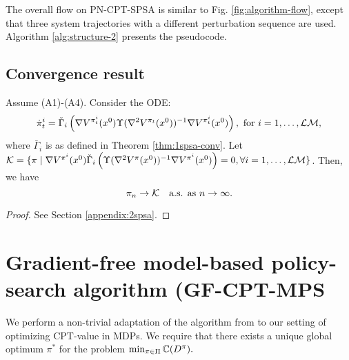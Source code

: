 \documentclass[11pt,letterpaper,english]{article}
\begin{document}
The overall flow on PN-CPT-SPSA is similar to Fig. \ref{fig:algorithm-flow}, except that three system trajectories with a different perturbation sequence are used. Algorithm \ref{alg:structure-2} presents the pseudocode.  

\subsection{Convergence result}
\begin{theorem}
\label{thm:2spsa}
Assume (A1)-(A4). 
Consider the ODE: 
$$
\dot\pi^{i}_t = \check\Gamma_{i}\left( \nabla V^{\pi^{i}_t}(x^0) \Upsilon(\nabla^2 V^{\pi_t}(x^0))^{-1} \nabla V^{\pi^{i}_t}(x^0) \right), \text { for }i=1,\dots,\mathcal{L}\mathcal{M},$$
where 
$\bar\Gamma_{i}$ is as defined in Theorem \ref{thm:1spsa-conv}. Let $\mathcal{K} = \{\pi \mid
\nabla V^{\pi^{i}}(x^0)  \check\Gamma_{i}\left(\Upsilon(\nabla^2 V^{\pi}(x^0))^{-1} \nabla V^{\pi^{i}}(x^0)\right)
=0, \forall i=1,\ldots,\mathcal{L}\mathcal{M}\}$. Then,
we have
$$\pi_n \rightarrow \mathcal{K}  \text{~~ a.s. as } n\rightarrow \infty.$$ 
\end{theorem}
\begin{proof}
 See Section \ref{appendix:2spsa}.
\end{proof}

\section{Gradient-free model-based policy-search algorithm (GF-CPT-MPS}
\label{sec:mras}
We perform a non-trivial adaptation of the algorithm from \cite{chang2013simulation} to our setting of optimizing CPT-value in MDPs.
We require that there exists a unique global optimum $\pi^*$ for the problem $\min_{\pi \in \Pi} \mathbb{C}(D^\pi).$
\end{document}
